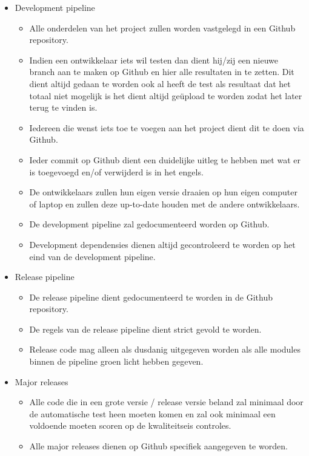 \documentclass[]{report}
\begin{document}
\begin{itemize}
	\item Development pipeline
	\begin{itemize}
		\item Alle onderdelen van het project zullen worden vastgelegd in een Github repository.
		\item Indien een ontwikkelaar iets wil testen dan dient hij/zij een nieuwe branch aan te maken op Github en hier alle resultaten in te zetten. Dit dient altijd gedaan te worden ook al heeft de test als resultaat dat het totaal niet mogelijk is het dient altijd ge\"{u}pload te worden zodat het later terug te vinden is.
		\item Iedereen die wenst iets toe te voegen aan het project dient dit te doen via Github.
		\item Ieder commit op Github dient een duidelijke uitleg te hebben met wat er is toegevoegd en/of verwijderd is in het engels.
		\item De ontwikkelaars zullen hun eigen versie draaien op hun eigen computer of laptop en zullen deze up-to-date houden met de andere ontwikkelaars.
		\item De development pipeline zal gedocumenteerd worden op Github.
		\item Development dependensies dienen altijd gecontroleerd te worden op het eind van de development pipeline.
		\newline
	\end{itemize}

	\item Release pipeline
	\begin{itemize}
		\item De release pipeline dient gedocumenteerd te worden in de Github repository.
		\item De regels van de release pipeline dient strict gevold te worden.
		\item Release code mag alleen als dusdanig uitgegeven worden als alle modules binnen de pipeline groen licht hebben gegeven.
		\newline
	\end{itemize}

	\item Major releases
	\begin{itemize}
		\item Alle code die in een grote versie / release versie beland zal minimaal door de automatische test heen moeten komen en zal ook minimaal een voldoende moeten scoren op de kwaliteitseis controles.
		\item Alle major releases dienen op Github specifiek aangegeven te worden.
		\newline
	\end{itemize}
	

\end{itemize}
\end{document}
